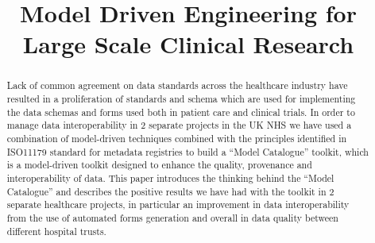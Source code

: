 \documentclass[conference]{IEEEtran}
\begin{document}
 


\title{Model Driven Engineering for \\ Large Scale Clinical Research}

\vskip 4mm 

\author{
}
\ifpdf
\graphicspath{{ASEFigs/}}
\fi

\maketitle

\begin{abstract}
Lack of common agreement on data standards across the healthcare industry have resulted in a proliferation of standards and schema which are used for implementing the data schemas and forms used both in patient care and clinical trials. In order to manage data interoperability in 2 separate projects in the UK NHS we have used a combination of model-driven techniques combined with the principles identified in ISO11179 standard for metadata registries to build a “Model Catalogue” toolkit, which is a model-driven toolkit designed to enhance the quality, provenance and interoperability of data. This paper introduces the thinking behind the “Model Catalogue” and describes the positive results we have had with the toolkit in 2 separate healthcare projects, in particular an improvement in data interoperability from the use of automated forms generation and overall in data quality between different hospital trusts.

\end{abstract}

\vskip 14mm

\noindent






 


\newpage




\end{document}

